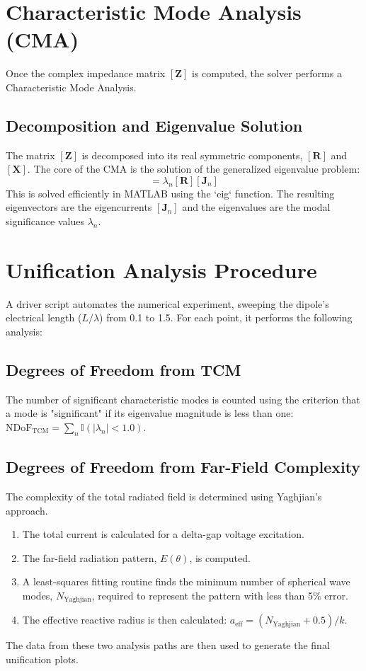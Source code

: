 \documentclass[11pt, a4paper]{report}
\begin{document}
\section{Characteristic Mode Analysis (CMA)}
Once the complex impedance matrix $[\mathbf{Z}]$ is computed, the solver performs a Characteristic Mode Analysis.

\subsection{Decomposition and Eigenvalue Solution}
The matrix $[\mathbf{Z}]$ is decomposed into its real symmetric components, $[\mathbf{R}]$ and $[\mathbf{X}]$. The core of the CMA is the solution of the generalized eigenvalue problem:
\begin{equation}
    [\mathbf{X}][\mathbf{J}_n] = \lambda_n [\mathbf{R}][\mathbf{J}_n]
\end{equation}
This is solved efficiently in MATLAB using the `eig` function. The resulting eigenvectors are the eigencurrents $[\mathbf{J}_n]$ and the eigenvalues are the modal significance values $\lambda_n$.

\section{Unification Analysis Procedure}
A driver script automates the numerical experiment, sweeping the dipole's electrical length ($L/\lambda$) from 0.1 to 1.5. For each point, it performs the following analysis:

\subsection{Degrees of Freedom from TCM}
The number of significant characteristic modes is counted using the criterion that a mode is "significant" if its eigenvalue magnitude is less than one: $\text{NDoF}_{\text{TCM}} = \sum_n \mathbb{I}(|\lambda_n| < 1.0)$.

\subsection{Degrees of Freedom from Far-Field Complexity}
The complexity of the total radiated field is determined using Yaghjian's approach.
\begin{enumerate}
    \item The total current is calculated for a delta-gap voltage excitation.
    \item The far-field radiation pattern, $E(\theta)$, is computed.
    \item A least-squares fitting routine finds the minimum number of spherical wave modes, $N_{\text{Yaghjian}}$, required to represent the pattern with less than 5\% error.
    \item The effective reactive radius is then calculated: $a_{\text{eff}} = (N_{\text{Yaghjian}} + 0.5) / k$.
\end{enumerate}
The data from these two analysis paths are then used to generate the final unification plots.
\end{document}
